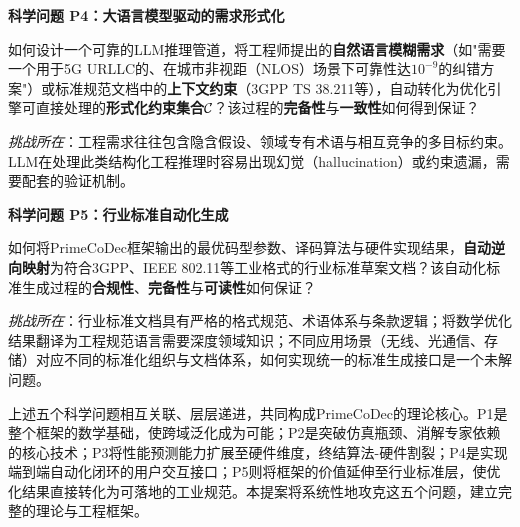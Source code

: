 \vspace{6pt}
\begin{tcolorbox}[problemstyle]
\textbf{科学问题 P4：大语言模型驱动的需求形式化}

如何设计一个可靠的LLM推理管道，将工程师提出的\textbf{自然语言模糊需求}（如"需要一个用于5G URLLC的、在城市非视距（NLOS）场景下可靠性达$10^{-9}$的纠错方案"）或标准规范文档中的\textbf{上下文约束}（3GPP TS 38.211等），自动转化为优化引擎可直接处理的\textbf{形式化约束集合}$\mathcal{C}$？该过程的\textbf{完备性}与\textbf{一致性}如何得到保证？

\textit{挑战所在}：工程需求往往包含隐含假设、领域专有术语与相互竞争的多目标约束。LLM在处理此类结构化工程推理时容易出现幻觉（hallucination）或约束遗漏，需要配套的验证机制。
\end{tcolorbox}

\vspace{6pt}
\begin{tcolorbox}[problemstyle]
\textbf{科学问题 P5：行业标准自动化生成}

如何将PrimeCoDec框架输出的最优码型参数、译码算法与硬件实现结果，\textbf{自动逆向映射}为符合3GPP、IEEE 802.11等工业格式的行业标准草案文档？该自动化标准生成过程的\textbf{合规性}、\textbf{完备性}与\textbf{可读性}如何保证？

\textit{挑战所在}：行业标准文档具有严格的格式规范、术语体系与条款逻辑；将数学优化结果翻译为工程规范语言需要深度领域知识；不同应用场景（无线、光通信、存储）对应不同的标准化组织与文档体系，如何实现统一的标准生成接口是一个未解问题。
\end{tcolorbox}

\vspace{6pt}
上述五个科学问题相互关联、层层递进，共同构成PrimeCoDec的理论核心。P1是整个框架的数学基础，使跨域泛化成为可能；P2是突破仿真瓶颈、消解专家依赖的核心技术；P3将性能预测能力扩展至硬件维度，终结算法-硬件割裂；P4是实现端到端自动化闭环的用户交互接口；P5则将框架的价值延伸至行业标准层，使优化结果直接转化为可落地的工业规范。本提案将系统性地攻克这五个问题，建立完整的理论与工程框架。